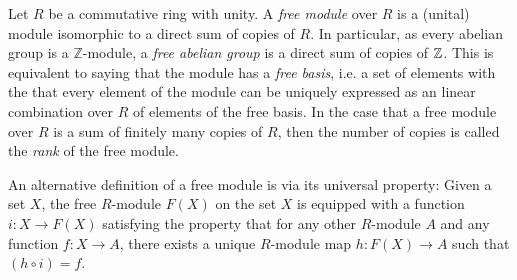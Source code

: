 \documentclass[12pt]{article}
\begin{document}
Let $R$ be a commutative ring with unity.  A {\it free module} over $R$ 
is a (unital) module isomorphic to a direct sum of copies of $R$.  In particular, as every abelian group is a $\mathbb{Z}$-module, a {\it free abelian group} is a direct sum of copies of $\Bbb{Z}$.  This is equivalent to saying that the module has a {\it free basis},
i.e. a set of elements with the  that every element of the module can be uniquely expressed as an linear combination over $R$
of elements of the free basis.  In the case that a free module over $R$ is a sum of finitely many copies of $R$, then the number of copies is called the {\it rank} of the free module.

An alternative definition of a free module is via its universal property:  Given a set $X$, the free $R$-module $F(X)$ on the set $X$ is equipped with a function $i:X\rightarrow F(X)$ satisfying the property that for any other $R$-module $A$ and any function $f:X\rightarrow A$, there exists a unique $R$-module map $h:F(X)\rightarrow A$ such that $(h\circ i)=f$.
\end{document}
